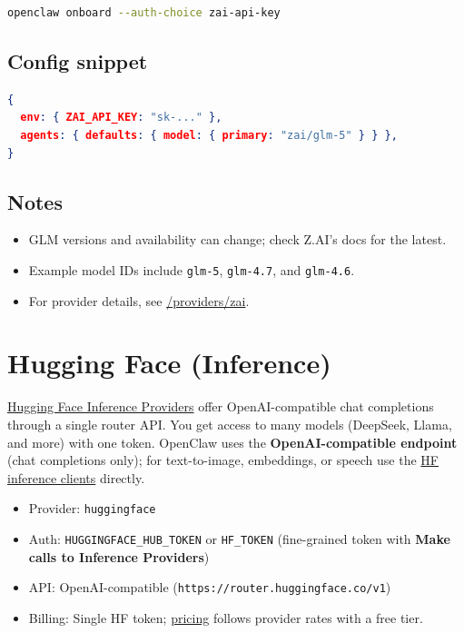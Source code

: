 \begin{lstlisting}[language=bash]
openclaw onboard --auth-choice zai-api-key
\end{lstlisting}


\subsection{Config snippet}


\begin{lstlisting}[language=json]
{
  env: { ZAI_API_KEY: "sk-..." },
  agents: { defaults: { model: { primary: "zai/glm-5" } } },
}
\end{lstlisting}


\subsection{Notes}


\begin{itemize}
  \item GLM versions and availability can change; check Z.AI's docs for the latest.
  \item Example model IDs include \texttt{glm-5}, \texttt{glm-4.7}, and \texttt{glm-4.6}.
  \item For provider details, see \href{/providers/zai}{/providers/zai}.
\end{itemize}



\clearpage

\section{Hugging Face (Inference)}


\href{https://huggingface.co/docs/inference-providers}{Hugging Face Inference Providers} offer OpenAI-compatible chat completions through a single router API. You get access to many models (DeepSeek, Llama, and more) with one token. OpenClaw uses the \textbf{OpenAI-compatible endpoint} (chat completions only); for text-to-image, embeddings, or speech use the \href{https://huggingface.co/docs/api-inference/quicktour}{HF inference clients} directly.

\begin{itemize}
  \item Provider: \texttt{huggingface}
  \item Auth: \texttt{HUGGINGFACE\_HUB\_TOKEN} or \texttt{HF\_TOKEN} (fine-grained token with \textbf{Make calls to Inference Providers})
  \item API: OpenAI-compatible (\texttt{https://router.huggingface.co/v1})
  \item Billing: Single HF token; \href{https://huggingface.co/docs/inference-providers/pricing}{pricing} follows provider rates with a free tier.
\end{itemize}


